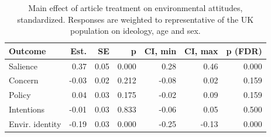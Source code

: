 \begin{table}[h!t]
\centering
\begin{tabular}{lrrrrrr}
  \hline
Outcome & Est. & SE & p & CI, min & CI, max & p (FDR) \\ 
  \hline
Salience & 0.37 & 0.05 & 0.000 & 0.28 & 0.46 & 0.000 \\ 
  Concern & -0.03 & 0.02 & 0.212 & -0.08 & 0.02 & 0.159 \\ 
  Policy & 0.04 & 0.03 & 0.175 & -0.02 & 0.09 & 0.159 \\ 
  Intentions & -0.01 & 0.03 & 0.833 & -0.06 & 0.05 & 0.500 \\ 
  Envir. identity & -0.19 & 0.03 & 0.000 & -0.25 & -0.13 & 0.000 \\ 
   \hline
\end{tabular}
\caption{Main effect of article treatment on environmental attitudes, standardized.
                   Responses are weighted to representative of the UK population on ideology, age and sex.} 
\label{tab:main_demweights}
\end{table}
